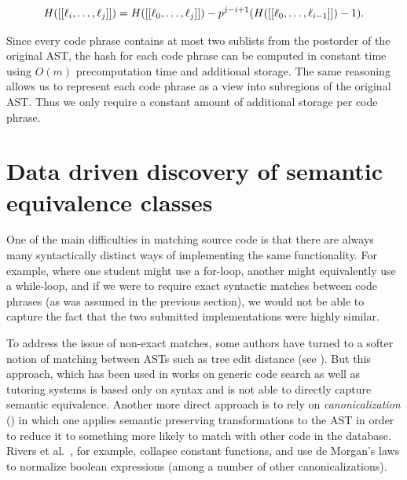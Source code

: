 {\scriptsize
\[
H([[{\bf \ell}_{i},\dots,{\bf \ell}_{j}]]) =  H([[{\bf \ell}_{0},\dots,{\bf \ell}_{j}]]) - p^{j-i+1} (H([[{\bf \ell}_{0},\dots,{\bf \ell}_{i-1}]]) - 1).
\]
}

\noindent Since every code phrase contains at most two sublists from the postorder of the
original AST, the hash for each code phrase can be computed in constant time using $O(m)$ precomputation time and additional storage.
The same reasoning allows us to represent each
code phrase as a view into subregions of the original AST.  
Thus we only require a constant amount of additional storage per code phrase.




\section{Data driven discovery of semantic equivalence classes}\label{sec:equivalence}
One of the main difficulties in matching source code  is that there are  
always many syntactically distinct ways of implementing the same functionality. 
For example, where one student might use a for-loop, another might equivalently use a while-loop,
and if we were to require exact syntactic matches between code phrases (as was assumed in the previous section), we would not be
able to capture the fact that the two submitted implementations were highly similar.

To address the issue of non-exact matches, some authors have turned to a softer notion of matching between ASTs
such as tree edit distance (see \cite{shasha94}). But this approach, which has been used in works on generic
code search as well as tutoring systems \cite{kim10,huang13,rivers13} is based only on syntax
and is not able to directly capture semantic equivalence.
Another more direct approach is to rely on \emph{canonicalization} (\cite{paul94,xu03,rivers12,rivers13}) in which one
applies semantic preserving transformations to the AST in order to reduce it to something more likely to match with other code in the database.
Rivers et al.~\cite{rivers12}, for example, collapse constant functions, and use de Morgan's laws to normalize boolean expressions (among a number of 
other canonicalizations).

